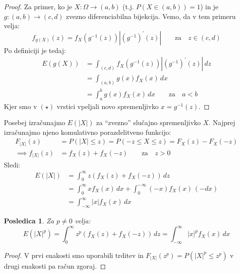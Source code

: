 \documentclass[12pt]{book}
\theoremstyle{definition}
\theoremstyle{plain}
\theoremstyle{plain}
\theoremstyle{plain}
\theoremstyle{plain}
\newtheorem{posledica}{Posledica}
\theoremstyle{remark}
\begin{document}
\begin{proof}
    Za primer, ko je $X: \Omega \to (a, b)$ (t.j. $P(X \in (a,b))= 1$) in je $g:(a, b) \to (c, d)$ zvezno diferenciabilna bijekcija. Vemo, da v tem primeru velja: 
    $$
    f_{g(X)}(z)=f_X\left(g^{-1}(z)\right)\left|\left(g^{-1}\right)^{\prime}(z)\right| \qquad \text{za} \quad z \in (c,d)
    $$  
    Po definiciji je tedaj: 
    \begin{align*}
        E(g(X))&=\int_{(c,d)} f_X\left(g^{-1}(z)\right)\left|\left(g^{-1}\right)^{\prime}(z)\right| \, d z \tag{$\star$} \\
        &=\int_{(a, b)} g(x) f_X(x) \, d x \\
        &=\int_a^b g(x) f_X(x) \, d x \qquad \text{za} \quad a<b
    \end{align*}
    Kjer smo v $(\star)$ vrstici vpeljali novo spremenljivko $x=g^{-1}(z)$.
\end{proof}

\begin{zgled}
    Posebej izračunajmo $E(|X|)$ za “zvezno” slučajno spremenljivko $X$. Najprej izračunajmo njeno komulativno porazdelitveno funkcijo: 
    $$
    \begin{aligned}
        F_{|X|}(z)&=P(|X| \leq z)=P(-z \leq X \leq z)=F_X(z)-F_X(-z) \\
        \implies f_{|X|}(z)&=f_X(z)+f_X(-z) \qquad \text{za} \quad z>0
    \end{aligned}
    $$
    Sledi: 
    $$
    \begin{aligned}
        E(|X|)&=\int_0^{\infty} z \left( f_X(z)+f_X(-z) \right) \, d z \\
        &=\int_0^{\infty} x f_X(x) \, d x+\int_0^{-\infty}(-x) f_X(x) \, (-d x) \\
        &=\int_{-\infty}^{\infty}|x| f_X(x) \, d x
    \end{aligned}
    $$
\end{zgled}

\begin{posledica}
    Za $p \neq 0$ velja: 
    $$
    E\left(|X|^p\right)=\int_{0}^{\infty}z^p\left(f_X(z)+f_X(-z)\right) \, d z=\int_{-\infty}^{\infty}|x|^p f_X(x) \, d x
    $$
\end{posledica}

\begin{proof}
    V prvi enakosti smo uporabili trditev in $F_{|X|}\left(z^p\right)= P\left(|X|^p \leq z^p\right)$ v drugi enakosti pa račun zgoraj. 
\end{proof}
\end{document}
